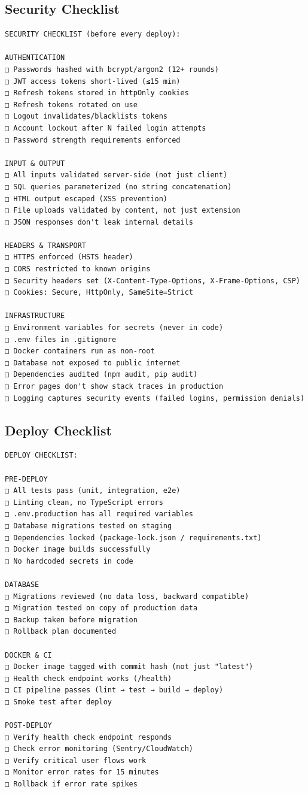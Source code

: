 \documentclass[10pt, a4paper]{article}
\begin{document}
\subsection{Security Checklist}


\begin{lstlisting}
SECURITY CHECKLIST (before every deploy):

AUTHENTICATION
□ Passwords hashed with bcrypt/argon2 (12+ rounds)
□ JWT access tokens short-lived (≤15 min)
□ Refresh tokens stored in httpOnly cookies
□ Refresh tokens rotated on use
□ Logout invalidates/blacklists tokens
□ Account lockout after N failed login attempts
□ Password strength requirements enforced

INPUT & OUTPUT
□ All inputs validated server-side (not just client)
□ SQL queries parameterized (no string concatenation)
□ HTML output escaped (XSS prevention)
□ File uploads validated by content, not just extension
□ JSON responses don't leak internal details

HEADERS & TRANSPORT
□ HTTPS enforced (HSTS header)
□ CORS restricted to known origins
□ Security headers set (X-Content-Type-Options, X-Frame-Options, CSP)
□ Cookies: Secure, HttpOnly, SameSite=Strict

INFRASTRUCTURE
□ Environment variables for secrets (never in code)
□ .env files in .gitignore
□ Docker containers run as non-root
□ Database not exposed to public internet
□ Dependencies audited (npm audit, pip audit)
□ Error pages don't show stack traces in production
□ Logging captures security events (failed logins, permission denials)
\end{lstlisting}


\subsection{Deploy Checklist}


\begin{lstlisting}
DEPLOY CHECKLIST:

PRE-DEPLOY
□ All tests pass (unit, integration, e2e)
□ Linting clean, no TypeScript errors
□ .env.production has all required variables
□ Database migrations tested on staging
□ Dependencies locked (package-lock.json / requirements.txt)
□ Docker image builds successfully
□ No hardcoded secrets in code

DATABASE
□ Migrations reviewed (no data loss, backward compatible)
□ Migration tested on copy of production data
□ Backup taken before migration
□ Rollback plan documented

DOCKER & CI
□ Docker image tagged with commit hash (not just "latest")
□ Health check endpoint works (/health)
□ CI pipeline passes (lint → test → build → deploy)
□ Smoke test after deploy

POST-DEPLOY
□ Verify health check endpoint responds
□ Check error monitoring (Sentry/CloudWatch)
□ Verify critical user flows work
□ Monitor error rates for 15 minutes
□ Rollback if error rate spikes
\end{lstlisting}
\end{document}
